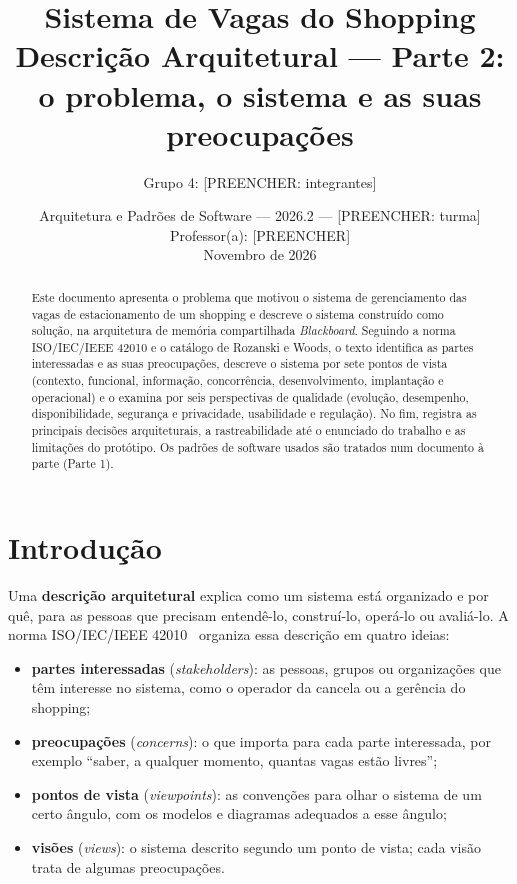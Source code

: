 

\title{\textbf{Sistema de Vagas do Shopping}\\[4pt]
\large Descrição Arquitetural --- Parte 2: o problema, o sistema e as suas preocupações}
\author{Grupo 4: [PREENCHER: integrantes]}
\date{Arquitetura e Padrões de Software --- 2026.2 --- [PREENCHER: turma]\\
Professor(a): [PREENCHER]\\[4pt]
Novembro de 2026}


\maketitle

\begin{abstract}
Este documento apresenta o problema que motivou o sistema de gerenciamento das vagas de estacionamento de um shopping e descreve o sistema construído como solução, na arquitetura de memória compartilhada \emph{Blackboard}. Seguindo a norma ISO/IEC/IEEE 42010 e o catálogo de Rozanski e Woods, o texto identifica as partes interessadas e as suas preocupações, descreve o sistema por sete pontos de vista (contexto, funcional, informação, concorrência, desenvolvimento, implantação e operacional) e o examina por seis perspectivas de qualidade (evolução, desempenho, disponibilidade, segurança e privacidade, usabilidade e regulação). No fim, registra as principais decisões arquiteturais, a rastreabilidade até o enunciado do trabalho e as limitações do protótipo. Os padrões de software usados são tratados num documento à parte (Parte 1).
\end{abstract}

\section{Introdução}

Uma \textbf{descrição arquitetural} explica como um sistema está organizado e por quê, para as pessoas que precisam entendê-lo, construí-lo, operá-lo ou avaliá-lo. A norma ISO/IEC/IEEE 42010~\cite{iso42010} organiza essa descrição em quatro ideias:

\begin{itemize}
  \item \textbf{partes interessadas} (\emph{stakeholders}): as pessoas, grupos ou organizações que têm interesse no sistema, como o operador da cancela ou a gerência do shopping;
  \item \textbf{preocupações} (\emph{concerns}): o que importa para cada parte interessada, por exemplo ``saber, a qualquer momento, quantas vagas estão livres'';
  \item \textbf{pontos de vista} (\emph{viewpoints}): as convenções para olhar o sistema de um certo ângulo, com os modelos e diagramas adequados a esse ângulo;
  \item \textbf{visões} (\emph{views}): o sistema descrito segundo um ponto de vista; cada visão trata de algumas preocupações.
\end{itemize}


